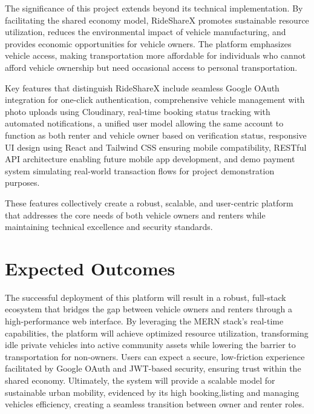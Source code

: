 \documentclass[12pt,a4paper]{report}
\begin{document}
    
    The significance of this project extends beyond its technical implementation. By facilitating the shared economy model, RideShareX promotes sustainable resource utilization, reduces the environmental impact of vehicle manufacturing, and provides economic opportunities for vehicle owners. The platform emphasizes vehicle access, making transportation more affordable for individuals who cannot afford vehicle ownership but need occasional access to personal transportation. 

    
    Key features that distinguish RideShareX include seamless Google OAuth\cite{oauth} integration for one-click authentication, comprehensive vehicle management with photo uploads using Cloudinary\cite{cloudinary}, real-time booking status tracking with automated notifications, a unified user model allowing the same account to function as both renter and vehicle owner based on verification status, responsive UI design using React\cite{react} and Tailwind CSS\cite{tailwind} ensuring mobile compatibility, RESTful API\cite{rest} architecture enabling future mobile app development, and demo payment system simulating real-world transaction flows for project demonstration purposes. 

    
    These features collectively create a robust, scalable, and user-centric platform that addresses the core needs of both vehicle owners and renters while maintaining technical excellence and security standards.

    \section{Expected Outcomes}
    The successful deployment of this platform will result in a robust, full-stack ecosystem that bridges the gap between vehicle owners and renters through a high-performance web interface. By leveraging the MERN stack's\cite{mern} real-time capabilities, the platform will achieve optimized resource utilization, transforming idle private vehicles into active community assets while lowering the barrier to transportation for non-owners. Users can expect a secure, low-friction experience facilitated by Google OAuth\cite{oauth} and JWT\cite{jwt}-based security, ensuring trust within the shared economy. Ultimately, the system will provide a scalable model for sustainable urban mobility, evidenced by its high booking,listing and managing vehicles efficiency, creating a seamless transition between owner and renter roles.

    
\end{document}
